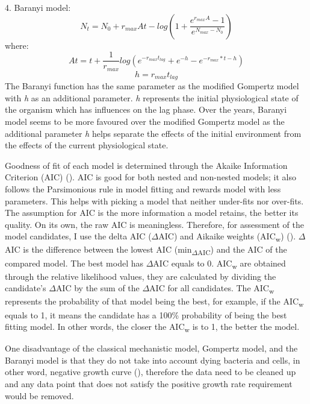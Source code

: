 \documentclass[11pt]{article}
\begin{document}
4. Baranyi model:
\begin{equation}
    N_{t} = N_{0} + r_{max}At - log(1 + \frac{{e ^ {r_{max}A} - 1}}{e^{N_{max} - N_{0}}})
\end{equation}
where:
\begin{equation}
    At = t + \frac{1}{r_{max}}log({e ^ {-r_{max}t_{lag}} + e ^ {-h} - e ^ {-r_{max} * t - h}})
\end{equation}
\begin{equation}
    h = r_{max} t_{lag}
\end{equation}
The Baranyi function has the same parameter as the modified Gompertz model with \emph{h} as an additional parameter. \emph{h} represents the initial physiological state of the organism which has influences on the lag phase. Over the years, Baranyi model seems to be more favoured over the modified Gompertz model as the additional parameter \emph{h} helps separate the effects of the initial environment from the effects of the current physiological state. 

Goodness of fit of each model is determined through the Akaike Information Criterion (AIC) (\citealt{1100705}). AIC is good for both nested and non-nested models; it also follows the Parsimonious rule in model fitting and rewards model with less parameters. This helps with picking a model that neither under-fits nor over-fits. The assumption for AIC is the more information a model retains, the better its quality. On its own, the raw AIC is meaningless. Therefore, for assessment of the model candidates, I use the delta AIC ($\Delta$AIC) and Aikaike weights ({AIC\textsubscript{w}}) ({\citealt[Appendix E]{doi:https://doi.org/10.1002/9781118856406.app5}}). $\Delta$AIC is the difference between the lowest AIC ({min\textsubscript{$\Delta$AIC}}) and the AIC of the compared model. The best model has $\Delta$AIC equals to 0. {AIC\textsubscript{w}} are obtained through the relative likelihood values, they are calculated by dividing the candidate's $\Delta$AIC by the sum of the $\Delta$AIC for all candidates. The {AIC\textsubscript{w}} represents the probability of that model being the best, for example, if the {AIC\textsubscript{w}} equals to 1, it means the candidate has a 100\% probability of being the best fitting model. In other words, the closer the {AIC\textsubscript{w}} is to 1, the better the model. 

One disadvantage of the classical mechanistic model, Gompertz model, and the Baranyi model is that they do not take into account dying bacteria and cells, in other word, negative growth curve ({\citealt{doi:10.1080/10408398.2011.570463}}), therefore the data need to be cleaned up and any data point that does not satisfy the positive growth rate requirement would be removed. 
\end{document}
